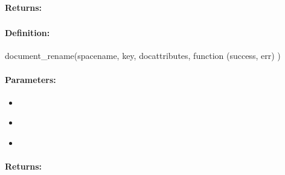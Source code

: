 \paragraph{Returns:}


\pagebreak
\subsubsection{}
\label{api:nodejs:document_rename}


\paragraph{Definition:}
\begin{javascriptcode}
document_rename(spacename, key, docattributes, function (success, err) {})
\end{javascriptcode}
\paragraph{Parameters:}
\begin{itemize}[noitemsep]
\item {}\\

\item {}\\

\item {}\\

\end{itemize}

\paragraph{Returns:}


\pagebreak
\subsubsection{}
\label{api:nodejs:document_unset}


